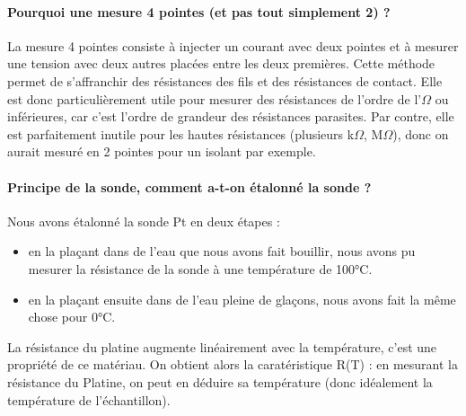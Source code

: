 \paragraph*{Pourquoi une mesure 4 pointes (et pas tout simplement 2) ?}
La mesure 4 pointes consiste à injecter un courant avec deux pointes et à mesurer une tension avec deux autres placées entre les deux premières.
Cette méthode permet de s'affranchir des résistances des fils et des résistances de contact.
Elle est donc particulièrement utile pour mesurer des résistances de l'ordre de l'$\Omega$ ou inférieures, car c'est l'ordre de grandeur des résistances parasites.
Par contre, elle est parfaitement inutile pour les hautes résistances (plusieurs k$\Omega$, M$\Omega$), donc on aurait mesuré en 2 pointes pour un isolant par exemple.


\paragraph*{Principe de la sonde, comment a-t-on étalonné la sonde ?}
Nous avons étalonné la sonde Pt en deux étapes :


\begin{itemize}
  \item en la plaçant dans de l'eau que nous avons fait bouillir, nous avons pu mesurer la résistance de la sonde à une température de 100°C.
  \item en la plaçant ensuite dans de l'eau pleine de glaçons, nous avons fait la même chose pour 0°C.
\end{itemize}


La résistance du platine augmente linéairement avec la température, c'est une propriété de ce matériau.
On obtient alors la caratéristique R(T) : en mesurant la résistance du Platine, on peut en déduire sa température (donc idéalement la température de l'échantillon).


